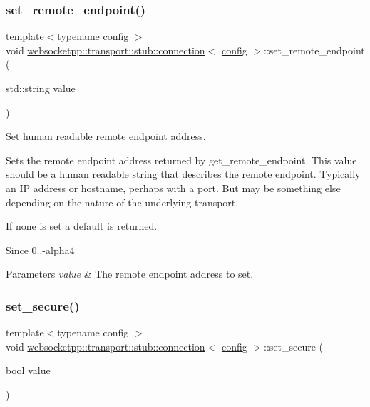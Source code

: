 \subsubsection{\texorpdfstring{set\+\_\+remote\+\_\+endpoint()}{set\_remote\_endpoint()}}
{\footnotesize\ttfamily template$<$typename config $>$ \\
void \mbox{\hyperlink{classwebsocketpp_1_1transport_1_1stub_1_1connection}{websocketpp\+::transport\+::stub\+::connection}}$<$ \mbox{\hyperlink{classconfig}{config}} $>$\+::set\+\_\+remote\+\_\+endpoint (\begin{DoxyParamCaption}\item[{std\+::string}]{value }\end{DoxyParamCaption})\hspace{0.3cm}{\ttfamily [inline]}}



Set human readable remote endpoint address. 

Sets the remote endpoint address returned by {\ttfamily get\+\_\+remote\+\_\+endpoint}. This value should be a human readable string that describes the remote endpoint. Typically an IP address or hostname, perhaps with a port. But may be something else depending on the nature of the underlying transport.

If none is set a default is returned.

\begin{DoxySince}{Since}
0..-\/alpha4
\end{DoxySince}

\begin{DoxyParams}{Parameters}
{\em value} & The remote endpoint address to set. \\
\hline
\end{DoxyParams}
\mbox{\label{classwebsocketpp_1_1transport_1_1stub_1_1connection_afc1b6434bfe02d2efcda9e2887af83c4}} 
\subsubsection{\texorpdfstring{set\+\_\+secure()}{set\_secure()}}
{\footnotesize\ttfamily template$<$typename config $>$ \\
void \mbox{\hyperlink{classwebsocketpp_1_1transport_1_1stub_1_1connection}{websocketpp\+::transport\+::stub\+::connection}}$<$ \mbox{\hyperlink{classconfig}{config}} $>$\+::set\+\_\+secure (\begin{DoxyParamCaption}\item[{bool}]{value }\end{DoxyParamCaption})\hspace{0.3cm}{\ttfamily [inline]}}



